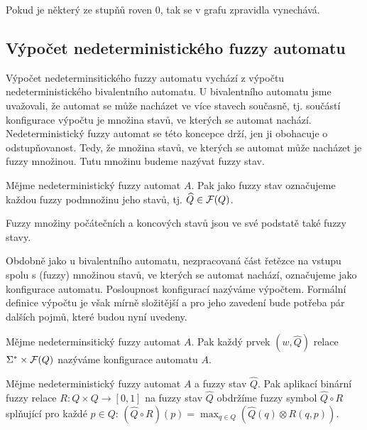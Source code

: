 \documentclass[a4paper,10pt]{article}
\begin{document}
Pokud je některý ze stupňů roven $0$, tak se v grafu zpravidla vynechává.

\begin{example}
\end{example}

\subsection{Výpočet nedeterministického fuzzy automatu}
Výpočet nedeterminsitického fuzzy automatu vychází z výpočtu nedeterministického bivalentního automatu. U bivalentního automatu jsme uvažovali, že automat se může nacházet ve více stavech současně, tj. součástí konfigurace výpočtu je množina stavů, ve kterých se automat nachází. Nedeterministický fuzzy automat se této koncepce drží, jen ji obohacuje o odstupňovanost. Tedy, že množina stavů, ve kterých se automat může nacházet je fuzzy množinou. Tutu množinu budeme nazývat fuzzy stav.

\begin{definition}\label{def-FuzzStav}
 Mějme nedeterministický fuzzy automat $A$. Pak jako fuzzy stav označujeme každou fuzzy podmnožinu jeho stavů, tj. $\widehat{Q} \in \mathcal{F}(Q)$.
\end{definition}

\begin{note}
 Fuzzy množiny počátečních a koncových stavů jsou ve své podstatě také fuzzy stavy.
\end{note}

Obdobně jako u bivalentního automatu, nezpracovaná část řetězce na vstupu spolu s (fuzzy) množinou stavů, ve kterých se automat nachází, označujeme jako konfigurace automatu. Posloupnost konfigurací nazýváme výpočtem. Formální definice výpočtu je však mírně složitější a pro jeho zavedení bude potřeba pár dalších pojmů, které budou nyní uvedeny.

\begin{definition}
  Mějme nedeterminsitický fuzzy automat $A$. Pak každý prvek $(w, \widehat{Q})$ relace $\Sigma^* \times \mathcal{F}(Q)$ nazýváme konfigurace automatu $A$.
\end{definition}


\begin{definition}
 Mějme nedeterministický fuzzy automat $A$ a fuzzy stav $\widehat{Q}$. Pak aplikací binární fuzzy relace $R: Q \times Q \rightarrow [0, 1]$ na fuzzy stav $\widehat{Q}$ obdržíme fuzzy symbol $\widehat{Q} \circ R$ splňující pro každé $p \in Q$: $(\widehat{Q} \circ R )(p) = \max_{q \in Q} (\widehat{Q}(q) \otimes R(q, p))$.
 
\end{definition}
\end{document}
